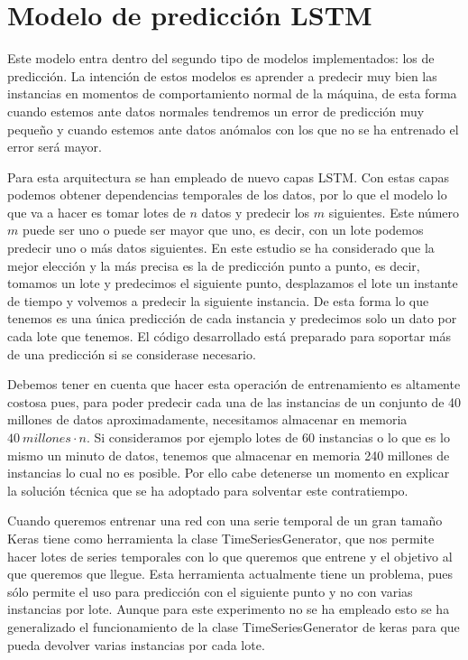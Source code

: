 \section{Modelo de predicción LSTM}

Este modelo entra dentro del segundo tipo de modelos implementados: los de predicción. La intención de estos modelos es aprender a predecir muy bien las instancias en momentos de comportamiento normal de la máquina, de esta forma cuando estemos ante datos normales tendremos un error de predicción muy pequeño y cuando estemos ante datos anómalos con los que no se ha entrenado el error será mayor.

Para esta arquitectura se han empleado de nuevo capas LSTM. Con estas capas podemos obtener dependencias temporales de los datos, por lo que el modelo lo que va a hacer es tomar lotes de $n$ datos y predecir los $m$ siguientes. Este número $m$ puede ser uno o puede ser mayor que uno, es decir, con un lote podemos predecir uno o más datos siguientes. En este estudio se ha considerado que la mejor elección y la más precisa es la de predicción punto a punto, es decir, tomamos un lote y predecimos el siguiente punto, desplazamos el lote un instante de tiempo y volvemos a predecir la siguiente instancia. De esta forma lo que tenemos es una única predicción de cada instancia y predecimos solo un dato por cada lote que tenemos. El código desarrollado está preparado para soportar más de una predicción si se considerase necesario.

Debemos tener en cuenta que hacer esta operación de entrenamiento es altamente costosa pues, para poder predecir cada una de las instancias de un conjunto de 40 millones de datos aproximadamente, necesitamos almacenar en memoria $40 \ millones \cdot n$. Si consideramos por ejemplo lotes de 60 instancias o lo que es lo mismo un minuto de datos, tenemos que almacenar en memoria 240 millones de instancias lo cual no es posible. Por ello cabe detenerse un momento en explicar la solución técnica que se ha adoptado para solventar este contratiempo.

Cuando queremos entrenar una red con una serie temporal de un gran tamaño Keras tiene como herramienta la clase TimeSeriesGenerator, que nos permite hacer lotes de series temporales con lo que queremos que entrene y el objetivo al que queremos que llegue. Esta herramienta actualmente tiene un problema, pues sólo permite el uso para predicción con el siguiente punto y no con varias instancias por lote. Aunque para este experimento no se ha empleado esto se ha generalizado el funcionamiento de la clase TimeSeriesGenerator de keras para que pueda devolver varias instancias por cada lote.

